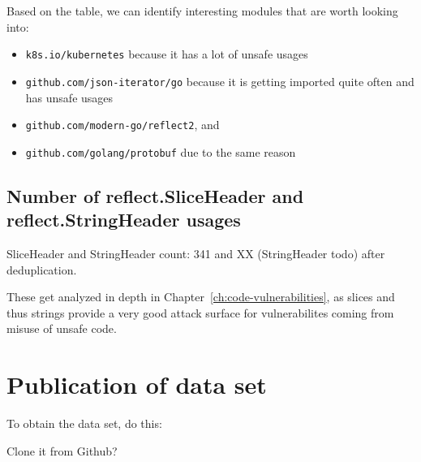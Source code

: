 Based on the table, we can identify interesting modules that are worth looking into:

\begin{itemize}
    \item \texttt{k8s.io/kubernetes} because it has a lot of unsafe usages
    \item \texttt{github.com/json-iterator/go} because it is getting imported quite often and has unsafe usages
    \item \texttt{github.com/modern-go/reflect2}, and
    \item \texttt{github.com/golang/protobuf} due to the same reason
\end{itemize}



\subsection{Number of reflect.SliceHeader and reflect.StringHeader usages}\label{subsec:results-sliceheader}

SliceHeader and StringHeader count: 341 and XX (StringHeader todo) after deduplication.

These get analyzed in depth in Chapter~\ref{ch:code-vulnerabilities}, as slices and thus strings provide a very good
attack surface for vulnerabilites coming from misuse of unsafe code.



\section{Publication of data set}\label{sec:survey-publication}

To obtain the data set, do this:

Clone it from Github?
